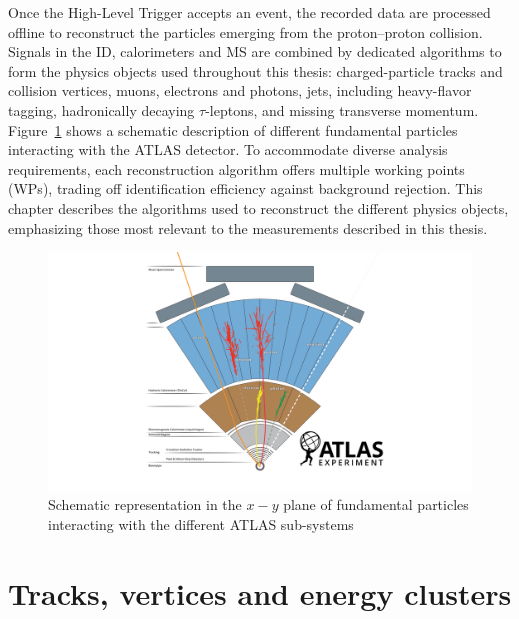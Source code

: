\newcommand*{\antikt}{anti-$\kappa_{t}$\xspace}
\newcommand*{\et}{$E^{\text{miss}}_{\text{T}}$\xspace}
\newcommand*{\tauhadvis}{$\tau_{\text{had-vis}}$\xspace}
\newcommand*{\tauhad}{$\tau_{\text{had}}$\xspace}

Once the High-Level Trigger accepts an event, the recorded data are processed offline to reconstruct the particles emerging from the proton–proton collision. 
Signals in the ID, calorimeters and MS are combined by dedicated algorithms to form the physics objects used throughout this thesis: charged-particle tracks and collision vertices, muons, electrons and photons, jets, including heavy-flavor tagging, hadronically decaying $\tau$-leptons, and missing transverse momentum. Figure~\ref{fig:reco} shows a schematic description of different fundamental particles interacting with the \acrshort{ATLAS} detector. 
To accommodate diverse analysis requirements, each reconstruction algorithm offers multiple working points (WPs), trading off identification efficiency against background rejection. This chapter describes the algorithms used to reconstruct the different physics objects, emphasizing those most relevant to the measurements described in this thesis.

\begin{figure}[htbp]
  \centering
  \includegraphics[width=1.0\textwidth]{images/atlas_particles.png}
  \caption{Schematic representation in the $x-y$ plane of fundamental particles interacting with the different ATLAS sub-systems~\cite{Bianchi:2837191}}
  \label{fig:reco}
 \end{figure}

\section{Tracks, vertices and energy clusters}
\label{sec:tracks}

